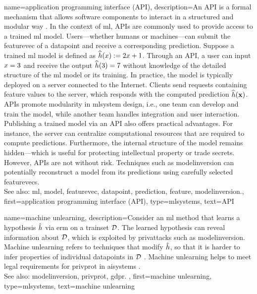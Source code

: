 {name={application programming interface (API)},
	description={An API is a formal mechanism that 
		allows software components to interact in a structured and modular way \cite{RestfulBook2013}.
		In the context of \gls{ml}, APIs are commonly used to provide access to a trained \gls{ml} \gls{model}. 
		Users—whether humans or machines—can submit the \gls{featurevec} of a \gls{datapoint} and receive 
		a corresponding \gls{prediction}. Suppose a trained \gls{ml} \gls{model} is defined 
		as $\widehat{h}(x) := 2 x + 1$. Through an API, a user 
		can input $x = 3$ and receive the \gls{output} $\widehat{h}(3) = 7$ 
		without knowledge of the detailed structure of the \gls{ml} \gls{model} or its \gls{training}. 
		In practice, the \gls{model} is typically deployed on a server connected to the Internet. 
		Clients send requests containing \gls{feature} values to the server, which responds with 
		the computed \gls{prediction} $\widehat{h}({\bf x})$. APIs promote modularity 
		in \gls{mlsystem} design, i.e., one team can develop and train the \gls{model}, while another team
		handles integration and user interaction. Publishing a trained \gls{model} via an API also 
		offers practical advantages. For instance, the server can centralize computational resources that 
		are required to compute \glspl{prediction}. Furthermore, the internal structure of the \gls{model} remains 
		hidden—which is useful for protecting intellectual property or trade secrets. 
		However, APIs are not without \gls{risk}. Techniques such as \gls{modelinversion} can potentially reconstruct a 
		\gls{model} from its \glspl{prediction} using carefully selected \glspl{featurevec}.
			\\
		See also: \gls{ml}, \gls{model}, \gls{featurevec}, \gls{datapoint}, \gls{prediction}, \gls{feature}, \gls{modelinversion}.},
	first={application programming interface (API)},
	type=mlsystems,
	text={API}
}

{name={machine unlearning},
	description={Consider an \gls{ml} method that learns a \gls{hypothesis} $\hat{h}$ 
		via \gls{erm} on a \gls{trainset} $\mathcal{D}$. The learned \gls{hypothesis} can 
		reveal information about $\mathcal{D}$, which is exploited by \glspl{privattack} such as 
		\gls{modelinversion}. Machine unlearning refers to techniques that 
		modify $\hat{h}$, so that it is harder to infer properties of individual 
		\glspl{datapoint} in $\mathcal{D}$ \cite{cao2015unlearning}. Machine unlearning helps 
		to meet legal requirements for \gls{privprot} in \glspl{aisystem} \cite{GDPR2016}. 
		\\
	 	See also: \gls{modelinversion}, \gls{privprot}, \gls{gdpr}. },
	first={machine unlearning},
	type=mlsystems,
	text={machine unlearning}
}

